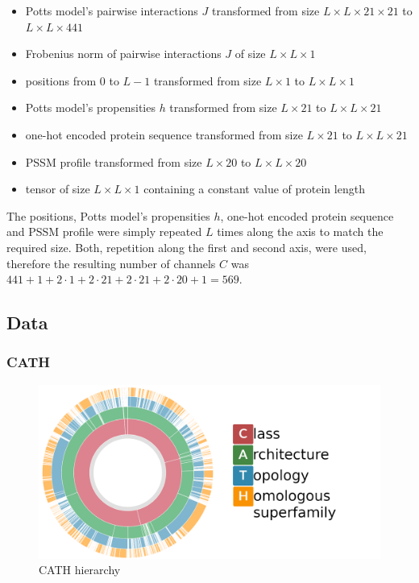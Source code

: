 \begin{itemize}
    \item Potts model's pairwise interactions $J$ transformed from size $L \times L \times 21 \times 21$ to $L \times L \times 441$
    \item Frobenius norm of pairwise interactions $J$ of size $L \times L \times 1$
    \item positions from $0$ to $L-1$ transformed from size $L \times 1$ to $L \times L \times 1$
    \item Potts model's propensities $h$ transformed from size $L \times 21$ to $L \times L \times 21$
    \item one-hot encoded protein sequence transformed from size $L \times 21$ to $L \times L \times 21$
    \item PSSM profile transformed from size $L \times 20$ to $L \times L \times 20$
    \item tensor of size $L \times L \times 1$ containing a constant value of protein length
\end{itemize}

The positions, Potts model's propensities $h$, one-hot encoded protein sequence and PSSM profile were simply repeated $L$ times along the axis to match the required size.
Both, repetition along the first and second axis, were used, therefore the resulting number of channels $C$ was $441 + 1 + 2 \cdot 1 + 2 \cdot 21 + 2 \cdot 21 + 2 \cdot 20 + 1 = 569$. 

\subsection{Data}

\subsubsection{CATH}
\begin{figure}
    \centering
    \includegraphics[width=\linewidth]{imgs_tomas/cath.png}
    \caption{CATH hierarchy \cite{cath}}
    \label{fig:cath}
\end{figure}

